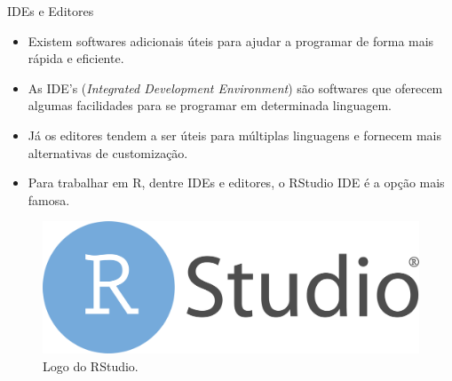 \documentclass[
  ignorenonframetext,
  serif,
  professionalfont,
  usenames,
  dvipsnames,
  aspectratio = 169]{beamer}
\providecommand{\tightlist}{%
  \setlength{\itemsep}{0pt}\setlength{\parskip}{0pt}}
\renewcommand{\tightlist}{%
  \setlength{\itemsep}{0\baselineskip}
  \setlength{\parskip}{0.25\baselineskip}
}
\def\beginAHalfColumn{\begin{minipage}{0.49\textwidth}}%
\def\endColumns{\end{minipage}}%
\begin{document}
\begin{frame}{IDEs e Editores}
\label{ides-e-editores}
\beginAHalfColumn

\begin{itemize}
\tightlist
\item
  Existem softwares adicionais úteis para ajudar a programar de forma
  mais rápida e eficiente.
\end{itemize}

\vspace{0.3cm}

\begin{itemize}
\tightlist
\item
  As IDE's (\emph{Integrated Development Environment}) são softwares que
  oferecem algumas facilidades para se programar em determinada
  linguagem.
\end{itemize}

\vspace{0.3cm}

\begin{itemize}
\tightlist
\item
  Já os editores tendem a ser úteis para múltiplas linguagens e fornecem
  mais alternativas de customização.
\end{itemize}

\endColumns
\beginAHalfColumn

\begin{itemize}
\tightlist
\item
  Para trabalhar em R, dentre IDEs e editores, o RStudio IDE é a opção
  mais famosa.
\end{itemize}

\vspace{1cm}

\begin{figure}

{\centering \includegraphics[width=0.6\linewidth]{./img/rstudiologo} 

}

\caption{Logo do RStudio.}\label{fig:unnamed-chunk-8}
\end{figure}

\endColumns
\end{frame}
\end{document}
